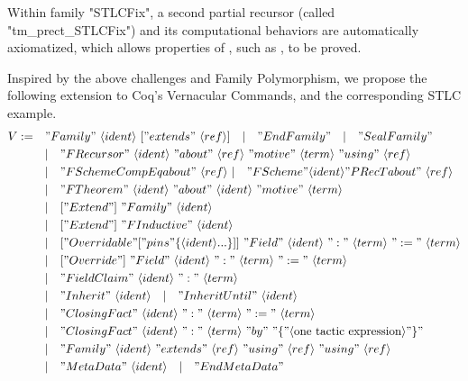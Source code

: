 Within family "STLCFix", a second partial recursor
(called "tm_prect_STLCFix") and its computational behaviors are automatically axiomatized,
which allows properties of , such as
, to be proved.



\ifShowOldWriting

\newpage

Inspired by the above challenges and Family Polymorphism, we propose
the following extension to Coq's Vernacular Commands, and the corresponding STLC example.
\begin{align*}
  V := \quad &"Family"~\langle ident\rangle~["extends"~\langle ref\rangle] 
  \quad |\quad "EndFamily" \quad | \quad "SealFamily" \\
  & |\quad "FRecursor"~\langle ident\rangle~"about"~\langle ref\rangle~"motive"~\langle term\rangle~"using"~\langle ref\rangle \\
  & |\quad "FScheme CompEq about"~\langle ref \rangle~|\quad "FScheme " \langle ident\rangle " PRecT about"~\langle ref \rangle\\
  & | \quad "FTheorem"~\langle ident\rangle~"about"~\langle ident\rangle~"motive"~\langle term\rangle \\
  & |\quad ["Extend"]~"Family"~\langle ident\rangle \\ 
  & |\quad ["Extend"]~"FInductive"~\langle ident\rangle \\ 
  & |\quad ["Overridable " ["pins " \{ \langle ident\rangle ... \}]]~"Field"~\langle ident\rangle~":"~\langle term \rangle~":="~\langle term \rangle \\
  & |\quad ["Override"]~"Field"~\langle ident\rangle~":"~\langle term \rangle~":="~\langle term \rangle \\
  & | \quad "FieldClaim"~\langle ident\rangle~":"~\langle term \rangle \\
  & | \quad "Inherit"~\langle ident\rangle \quad | \quad "Inherit Until"~\langle ident\rangle \quad \\
  & | \quad "Closing Fact"~\langle ident\rangle~":"~\langle term \rangle~":="~\langle term \rangle \\ 
  & | \quad "Closing Fact"~\langle ident\rangle~":"~\langle term \rangle~"by"~"\{"\langle \text{one tactic expression}\rangle"\}" \\ 
  & | \quad "Family"~\langle ident\rangle~"extends"~\langle ref\rangle~"using"~\langle ref\rangle~"using"~\langle ref\rangle \\ 
  & | \quad "MetaData"~\langle ident\rangle \quad | \quad "EndMetaData" \\ 
\end{align*}

